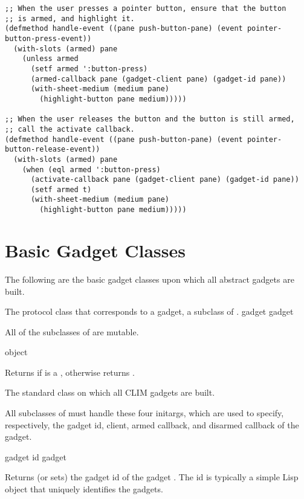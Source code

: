 \begin{verbatim}
;; When the user presses a pointer button, ensure that the button
;; is armed, and highlight it. 
(defmethod handle-event ((pane push-button-pane) (event pointer-button-press-event))
  (with-slots (armed) pane
    (unless armed
      (setf armed ':button-press)
      (armed-callback pane (gadget-client pane) (gadget-id pane))
      (with-sheet-medium (medium pane)
        (highlight-button pane medium)))))

;; When the user releases the button and the button is still armed,
;; call the activate callback.
(defmethod handle-event ((pane push-button-pane) (event pointer-button-release-event))
  (with-slots (armed) pane
    (when (eql armed ':button-press)
      (activate-callback pane (gadget-client pane) (gadget-id pane))
      (setf armed t)
      (with-sheet-medium (medium pane)
        (highlight-button pane medium)))))
\end{verbatim}


\section {Basic Gadget Classes}

The following are the basic gadget classes upon which all abstract gadgets are
built.


The protocol class that corresponds to a gadget, a subclass of .
 {gadget} {gadget}

All of the subclasses of  are mutable.

 {object}

Returns  if  is a , otherwise returns
.


The standard class on which all CLIM gadgets are built.


All subclasses of  must handle these four initargs, which are used to
specify, respectively, the gadget id, client, armed callback, and disarmed
callback of the gadget.

 {gadget}
 {id gadget}

Returns (or sets) the gadget id of the gadget .  The id is typically
a simple Lisp object that uniquely identifies the gadgets.

